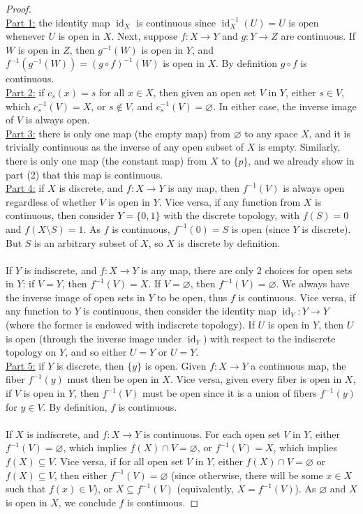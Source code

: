 \documentclass{treatise}
\begin{document}
\begin{proof} \ \\
\underline{Part 1:} the identity map $\operatorname{id}_X$ is continuous since $\operatorname{id}_X^{-1}(U) = U$ is open whenever $U$ is open in $X$. Next, suppose $f: X \to Y$ and $g: Y \to Z$ are continuous. If $W$ is open in $Z$, then $g^{-1}(W)$ is open in $Y$, and $f^{-1}(g^{-1}(W)) = (g \circ f)^{-1}(W)$ is open in $X$. By definition $g \circ f$ is continuous.
\\
\underline{Part 2:} if $c_s(x) = s$ for all $x \in X$, then given an open set $V$ in $Y$, either $s \in V$, which $c_s^{-1}(V) = X$, or $s \notin V$, and $c_s^{-1}(V) = \varnothing$. In either case, the inverse image of $V$ is always open.
\\
\underline{Part 3:} there is only one map (the empty map) from $\varnothing$ to any space $X$, and it is trivially continuous as the inverse of any open subset of $X$ is empty. Similarly, there is only one map (the constant map) from $X$ to $\{ p \}$, and we already show in part (2) that this map is continuous.
\\
\underline{Part 4:} if $X$ is discrete, and $f: X \to Y$ is any map, then $f^{-1}(V)$ is always open regardless of whether $V$ is open in $Y$. Vice versa, if any function from $X$ is continuous, then consider $Y = \{ 0, 1 \}$ with the discrete topology, with $f(S) = 0$ and $f(X \setminus S) = 1$. As $f$ is continuous, $f^{-1}(0) = S$ is open (since $Y$ is discrete). But $S$ is an arbitrary subset of $X$, so $X$ is discrete by definition.
\\
\\
If $Y$ is indiscrete, and $f: X \to Y$ is any map, there are only 2 choices for open sets in $Y$: if $V = Y$, then $f^{-1}(V) = X$. If $V = \varnothing$, then $f^{-1}(V) = \varnothing$. We always have the inverse image of open sets in $Y$ to be open, thus $f$ is continuous. Vice versa, if any function to $Y$ is continuous, then consider the identity map $\operatorname{id}_Y : Y \to Y$ (where the former is endowed with indiscrete topology). If $U$ is open in $Y$, then $U$ is open (through the inverse image under $\operatorname{id}_Y$) with respect to the indiscrete topology on $Y$, and so either $U = Y$ or $U = Y$.
\\
\underline{Part 5:} if $Y$ is discrete, then $\{ y \}$ is open. Given $f: X \to Y$ a continuous map, the fiber $f^{-1}(y)$ must then be open in $X$. Vice versa, given every fiber is open in $X$, if $V$ is open in $Y$, then $f^{-1}(V)$ must be open since it is a union of fibers $f^{-1}(y)$ for $y \in V$. By definition, $f$ is continuous.
\\
\\
If $X$ is indiscrete, and $f: X \to Y$ is continuous. For each open set $V$ in $Y$, either $f^{-1}(V) = \varnothing$, which implies $f(X) \cap V = \varnothing$, or $f^{-1}(V) = X$, which implies $f(X) \subseteq V$. Vice versa, if for all open set $V$ in $Y$, either $f(X) \cap V = \varnothing$ or $f(X) \subseteq V$, then either $f^{-1}(V) = \varnothing$ (since otherwise, there will be some $x \in X$ such that $f(x) \in V$), or $X \subseteq f^{-1}(V)$ (equivalently, $X = f^{-1}(V)$). As $\varnothing$ and $X$ is open in $X$, we conclude $f$ is continuous.
\end{proof}
\end{document}
